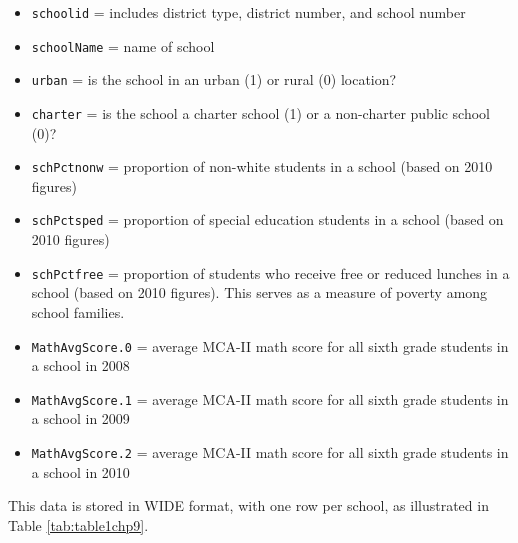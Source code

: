 \documentclass[
]{krantz}
\providecommand{\tightlist}{%
  \setlength{\itemsep}{0pt}\setlength{\parskip}{0pt}}
\begin{document}
\begin{itemize}
\tightlist
\item
  \texttt{schoolid} = includes district type, district number, and school number
\item
  \texttt{schoolName} = name of school
\item
  \texttt{urban} = is the school in an urban (1) or rural (0) location?
\item
  \texttt{charter} = is the school a charter school (1) or a non-charter public school (0)?
\item
  \texttt{schPctnonw} = proportion of non-white students in a school (based on 2010 figures)
\item
  \texttt{schPctsped} = proportion of special education students in a school (based on 2010 figures)
\item
  \texttt{schPctfree} = proportion of students who receive free or reduced lunches in a school (based on 2010 figures). This serves as a measure of poverty among school families.
\item
  \texttt{MathAvgScore.0} = average MCA-II math score for all sixth grade students in a school in 2008
\item
  \texttt{MathAvgScore.1} = average MCA-II math score for all sixth grade students in a school in 2009
\item
  \texttt{MathAvgScore.2} = average MCA-II math score for all sixth grade students in a school in 2010
\end{itemize}

This data is stored in WIDE format, with one row per school, as illustrated in Table \ref{tab:table1chp9}.

\begin{table}
\centering
\caption{\label{tab:table1chp9}The first six observations in the wide data set for the Charter Schools case study.}
\centering
{}
\end{table}
\end{document}
